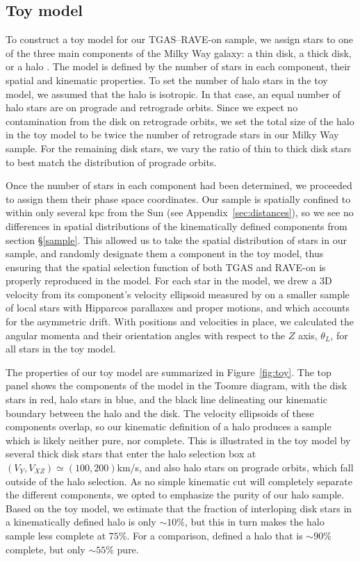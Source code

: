 \documentclass[apj, twocolappendix, numberedappendix, appendixfloats]{emulateapj}
\begin{document}
\subsection{Toy model}
\label{sec:toymodel}
To construct a toy model for our TGAS--RAVE-on sample, we assign stars to one of the three main components of the Milky Way galaxy: a thin disk, a thick disk, or a halo \citep[e.g.,][]{bhg2016}.
The model is defined by the number of stars in each component, their spatial and kinematic properties.
To set the number of halo stars in the toy model, we assumed that the halo is isotropic.
In that case, an equal number of halo stars are on prograde and retrograde orbits. 
Since we expect no contamination from the disk on retrograde orbits, we set the total size of the halo in the toy model to be twice the number of retrograde stars in our Milky Way sample.
For the remaining disk stars, we vary the ratio of thin to thick disk stars to best match the distribution of prograde orbits.

Once the number of stars in each component had been determined, we proceeded to assign them their phase space coordinates.
Our sample is spatially confined to within only several kpc from the Sun (see Appendix~\ref{sec:distances}), so we see no differences in spatial distributions of the kinematically defined components from section \S\ref{sample}.
This allowed us to take the spatial distribution of stars in our sample, and randomly designate them a component in the toy model, thus ensuring that the spatial selection function of both TGAS and RAVE-on is properly reproduced in the model.
For each star in the model, we drew a 3D velocity from its component's velocity ellipsoid measured by \citet{bensby2003} on a smaller sample of local stars with Hipparcos parallaxes and proper motions, and which accounts for the asymmetric drift.
With positions and velocities in place, we calculated the angular momenta and their orientation angles with respect to the $Z$ axis, $\theta_L$, for all stars in the toy model.

The properties of our toy model are summarized in Figure~\ref{fig:toy}.
The top panel shows the components of the model in the Toomre diagram, with the disk stars in red, halo stars in blue, and the black line delineating our kinematic boundary between the halo and the disk.
The velocity ellipsoids of these components overlap, so our kinematic definition of a halo produces a sample which is likely neither pure, nor complete.
This is illustrated in the toy model by several thick disk stars that enter the halo selection box at $(V_Y, V_{XZ}) \simeq (100,200)$\;km/s, and also halo stars on prograde orbits, which fall outside of the halo selection.
As no simple kinematic cut will completely separate the different components, we opted to emphasize the purity of our halo sample.
Based on the toy model, we estimate that the fraction of interloping disk stars in a kinematically defined halo is only $\sim10\%$, but this in turn makes the halo sample less complete at $75\%$.
For a comparison, \citet{ns2010} defined a halo that is $\sim90\%$ complete, but only $\sim55\%$ pure.
\end{document}
